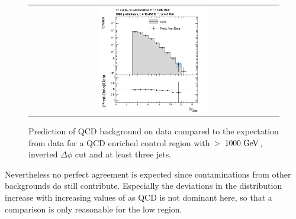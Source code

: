 \begin{figure}[h]
\begin{tabular}{cc}
                \multicolumn{2}{c}{\includegraphics[width=0.45\textwidth]{figures/NJets_presel_HThigh_chsJets_535_Run2012ABCD_data_pt10_withUncertainties_UseRebCorrection_v3.png}}
  \end{tabular}
  \caption{Prediction of QCD background on data compared to the expectation from data for a QCD enriched control region with \HT$>~1000~\rm{GeV}$, inverted $\Delta \phi$ cut and at least three jets.}
  \label{fig:qcd_rs_dataclosure}
\end{figure}
Nevertheless no perfect agreement is expected since contaminations from other backgrounds do still contribute. Especially the deviations in the \MHT distribution increase with increasing values of \MHT as QCD is not dominant here, so that a comparison is only reasonable for the low \MHT region. 

